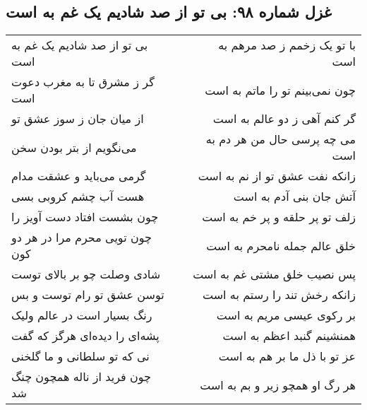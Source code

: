 \begin{center}
\section*{غزل شماره ۹۸: بی تو از صد شادیم یک غم به است}
\label{sec:098}
\begin{longtable}{l p{0.5cm} r}
بی تو از صد شادیم یک غم به است
&&
با تو یک زخمم ز صد مرهم به است
\\
گر ز مشرق تا به مغرب دعوت است
&&
چون نمی‌بینم تو را ماتم به است
\\
از میان جان ز سوز عشق تو
&&
گر کنم آهی ز دو عالم به است
\\
می‌نگویم از بتر بودن سخن
&&
می چه پرسی حال من هر دم به است
\\
گرمی می‌باید و عشقت مدام
&&
زانکه نفت عشق تو از نم به است
\\
هست آب چشم کروبی بسی
&&
آتش جان بنی آدم به است
\\
چون بشست افتاد دست آویز را
&&
زلف تو پر حلقه و پر خم به است
\\
چون تویی محرم مرا در هر دو کون
&&
خلق عالم جمله نامحرم به است
\\
شادی وصلت چو بر بالای توست
&&
پس نصیب خلق مشتی غم به است
\\
توسن عشق تو رام توست و بس
&&
زانکه رخش تند را رستم به است
\\
رنگ بسیار است در عالم ولیک
&&
بر رکوی عیسی مریم به است
\\
پشه‌ای را دیده‌ای هرگز که گفت
&&
همنشینم گنبد اعظم به است
\\
نی که تو سلطانی و ما گلخنی
&&
عز تو با ذل ما بر هم به است
\\
چون فرید از ناله همچون چنگ شد
&&
هر رگ او همچو زیر و بم به است
\\
\end{longtable}
\end{center}

